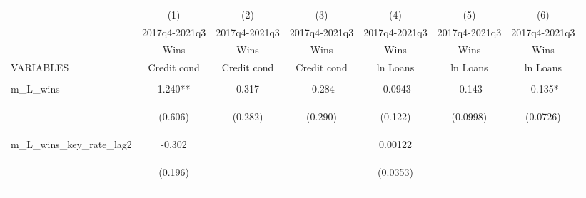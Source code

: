 \documentclass[]{article}
\begin{document}
\begin{center}
\begin{tabular}{lcccccc} \hline
 & (1) & (2) & (3) & (4) & (5) & (6) \\
 & 2017q4-2021q3 & 2017q4-2021q3 & 2017q4-2021q3 & 2017q4-2021q3 & 2017q4-2021q3 & 2017q4-2021q3 \\
 & Wins & Wins & Wins & Wins & Wins & Wins \\
VARIABLES & Credit cond & Credit cond & Credit cond & ln Loans & ln Loans & ln Loans \\ \hline
\vspace{4pt} & \begin{footnotesize}\end{footnotesize} & \begin{footnotesize}\end{footnotesize} & \begin{footnotesize}\end{footnotesize} & \begin{footnotesize}\end{footnotesize} & \begin{footnotesize}\end{footnotesize} & \begin{footnotesize}\end{footnotesize} \\
m\_L\_wins & 1.240** & 0.317 & -0.284 & -0.0943 & -0.143 & -0.135* \\
\vspace{4pt} & \begin{footnotesize}(0.606)\end{footnotesize} & \begin{footnotesize}(0.282)\end{footnotesize} & \begin{footnotesize}(0.290)\end{footnotesize} & \begin{footnotesize}(0.122)\end{footnotesize} & \begin{footnotesize}(0.0998)\end{footnotesize} & \begin{footnotesize}(0.0726)\end{footnotesize} \\
m\_L\_wins\_key\_rate\_lag2 & -0.302 &  &  & 0.00122 &  &  \\
\vspace{4pt} & \begin{footnotesize}(0.196)\end{footnotesize} & \begin{footnotesize}\end{footnotesize} & \begin{footnotesize}\end{footnotesize} & \begin{footnotesize}(0.0353)\end{footnotesize} & \begin{footnotesize}\end{footnotesize} & \begin{footnotesize}\end{footnotesize} \\

\end{tabular}
\end{center}
\end{document}
